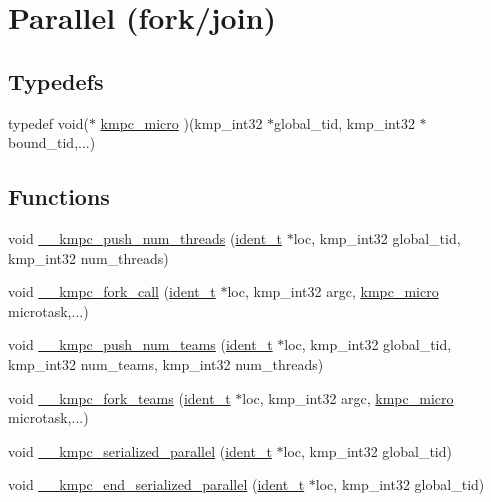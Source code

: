 \hypertarget{group__PARALLEL}{\section{Parallel (fork/join)}
\label{group__PARALLEL}
}
\subsection*{Typedefs}
\begin{DoxyCompactItemize}
\item 
typedef void($\ast$ \hyperlink{group__PARALLEL_gab49014fb4572e7d0f308fd9b1824daf7}{kmpc\-\_\-micro} )(kmp\-\_\-int32 $\ast$global\-\_\-tid, kmp\-\_\-int32 $\ast$bound\-\_\-tid,...)
\end{DoxyCompactItemize}
\subsection*{Functions}
\begin{DoxyCompactItemize}
\item 
void \hyperlink{group__PARALLEL_ga345b3a5866deefefc91ae1e8958f49f4}{\-\_\-\-\_\-kmpc\-\_\-push\-\_\-num\-\_\-threads} (\hyperlink{group__BASIC__TYPES_ga690fda6b92f039a72db263c6b4394ddb}{ident\-\_\-t} $\ast$loc, kmp\-\_\-int32 global\-\_\-tid, kmp\-\_\-int32 num\-\_\-threads)
\item 
void \hyperlink{group__PARALLEL_gac2b7cc2fa78dde5381bcf00cfc48d124}{\-\_\-\-\_\-kmpc\-\_\-fork\-\_\-call} (\hyperlink{group__BASIC__TYPES_ga690fda6b92f039a72db263c6b4394ddb}{ident\-\_\-t} $\ast$loc, kmp\-\_\-int32 argc, \hyperlink{group__PARALLEL_gab49014fb4572e7d0f308fd9b1824daf7}{kmpc\-\_\-micro} microtask,...)
\item 
void \hyperlink{group__PARALLEL_gaae9462b03457d809faeb3e767a5b2283}{\-\_\-\-\_\-kmpc\-\_\-push\-\_\-num\-\_\-teams} (\hyperlink{group__BASIC__TYPES_ga690fda6b92f039a72db263c6b4394ddb}{ident\-\_\-t} $\ast$loc, kmp\-\_\-int32 global\-\_\-tid, kmp\-\_\-int32 num\-\_\-teams, kmp\-\_\-int32 num\-\_\-threads)
\item 
void \hyperlink{group__PARALLEL_ga1cab712d076ba1d2758b0c3bf5ffe38a}{\-\_\-\-\_\-kmpc\-\_\-fork\-\_\-teams} (\hyperlink{group__BASIC__TYPES_ga690fda6b92f039a72db263c6b4394ddb}{ident\-\_\-t} $\ast$loc, kmp\-\_\-int32 argc, \hyperlink{group__PARALLEL_gab49014fb4572e7d0f308fd9b1824daf7}{kmpc\-\_\-micro} microtask,...)
\item 
void \hyperlink{group__PARALLEL_ga7b1ba1cc8d9d2fea8654bbb1e59f079e}{\-\_\-\-\_\-kmpc\-\_\-serialized\-\_\-parallel} (\hyperlink{group__BASIC__TYPES_ga690fda6b92f039a72db263c6b4394ddb}{ident\-\_\-t} $\ast$loc, kmp\-\_\-int32 global\-\_\-tid)
\item 
void \hyperlink{group__PARALLEL_gac341818e68b06d910111e4cf08bb54dd}{\-\_\-\-\_\-kmpc\-\_\-end\-\_\-serialized\-\_\-parallel} (\hyperlink{group__BASIC__TYPES_ga690fda6b92f039a72db263c6b4394ddb}{ident\-\_\-t} $\ast$loc, kmp\-\_\-int32 global\-\_\-tid)
\end{DoxyCompactItemize}


